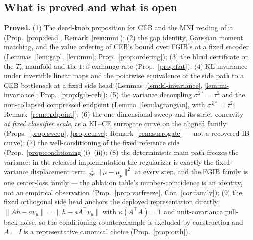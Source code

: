 \subsection{What is proved and what is open}\label{sec:limits}

\begin{remark}
\textbf{Proved.} (1) The dead-knob proposition for CEB and the MNI reading of it
(Prop.~\ref{prop:dead}, Remark~\ref{rem:mni}); (2) the gap identity, Gaussian moment
matching, and the value ordering of CEB's bound over FGIB's at a fixed encoder
(Lemmas~\ref{lem:gap}, \ref{lem:mm}; Prop.~\ref{prop:ordering}); (3) the blind
certificate on the $T_\alpha$ manifold and the $1{:}\beta$ exchange rate
(Prop.~\ref{prop:flat}); (4) KL invariance under invertible linear maps and the
pointwise equivalence of the side path to a CEB bottleneck at a fixed side head
(Lemmas~\ref{lem:kl-invariance}, \ref{lem:mi-invariance}; Prop.~\ref{prop:fgib-ceb});
(5) the variance decoupling $\sigma^{2*} = \tau^2$ and the non-collapsed compressed endpoint
(Lemma~\ref{lem:lagrangian}, with $\sigma^{2*} = \tau^2$;
Remark~\ref{rem:endpoint}); (6) the one-dimensional sweep
and its strict concavity \emph{at fixed classifier scale}, as a KL--CE surrogate curve
on the aligned family (Props.~\ref{prop:sweep}, \ref{prop:curve};
Remark~\ref{rem:surrogate} --- not a recovered IB curve); (7) the well-conditioning of the fixed
reference side (Prop.~\ref{prop:conditioning}(i)--(ii)); (8) the deterministic main path
freezes the variance: in the released implementation the regularizer is exactly the
fixed-variance displacement term $\tfrac{1}{2\tau^2}\|\mu-\mu_p\|^2$ at every step, and
the FGIB family is one center-loss family --- the ablation table's number-coincidence is
an identity, not an empirical observation (Prop.~\ref{prop:varfreeze},
Cor.~\ref{cor:family}); (9) the fixed orthogonal side head anchors the deployed
representation directly: $\|Ah - av_y\| = \|h - aA^{\top}v_y\|$ with $\kappa(A^{\top}A)
= 1$ and unit-covariance pull-back noise, so the conditioning counterexample is excluded
by construction and $A = I$ is a representative canonical choice
(Prop.~\ref{prop:orth}).


\end{remark}

